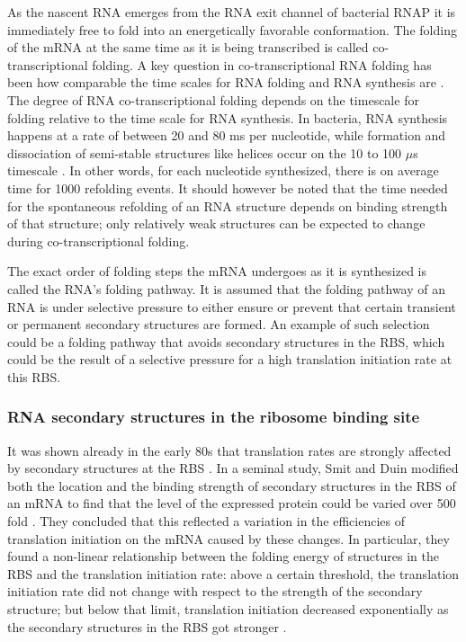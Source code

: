 As the nascent RNA emerges from the RNA exit channel of bacterial RNAP it is
immediately free to fold into an energetically favorable conformation. The
folding of the mRNA at the same time as it is being transcribed is called
co-transcriptional folding. A key question in co-transcriptional RNA folding
has been how comparable the time scales for RNA folding and RNA synthesis are
\cite{de_smit_translational_2003}. The degree of RNA co-transcriptional folding
depends on the timescale for folding relative to the time scale for RNA
synthesis. In bacteria, RNA synthesis happens at a rate of between 20 and 80 ms
per nucleotide, while formation and dissociation of semi-stable structures like
helices occur on the 10 to 100 $\mu$s timescale \cite{isambert_jerky_2009}. In
other words, for each nucleotide synthesized, there is on average time for 1000
refolding events. It should however be noted that the time needed for the
spontaneous refolding of an RNA structure depends on binding strength of
that structure; only relatively weak structures can be expected to change
during co-transcriptional folding.

The exact order of folding steps the mRNA undergoes as it is synthesized is
called the RNA's folding pathway. It is assumed that the folding pathway of an
RNA is under selective pressure to either ensure or prevent that certain
transient or permanent secondary structures are formed\cite{pan_rna_2006}. An
example of such selection could be a folding pathway that avoids secondary
structures in the RBS, which could be the result of a selective pressure for a
high translation initiation rate at this RBS.

\subsubsection{RNA secondary structures in the ribosome binding site}
It was shown already in the early 80s that translation rates are strongly
affected by secondary structures at the RBS \cite{hall_role_1982}. In a seminal
study, Smit and Duin modified both the location and the binding strength of
secondary structures in the RBS of an mRNA to find that the level of the
expressed protein could be varied over 500 fold
\cite{de_smit_secondary_1990}. They concluded that this reflected a variation
in the efficiencies of translation initiation on the mRNA caused by these
changes. In particular, they found a non-linear relationship between the
folding energy of structures in the RBS and the translation initiation rate:
above a certain threshold, the translation initiation rate did not change with
respect to the strength of the secondary structure; but below that limit,
translation initiation decreased exponentially as the secondary structures in
the RBS got stronger \cite{de_smit_secondary_1990}.

